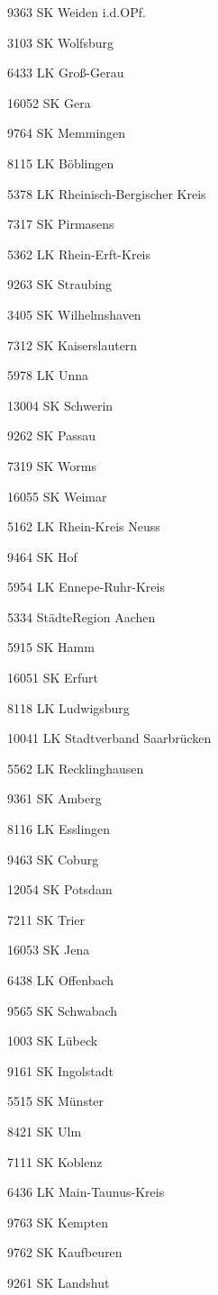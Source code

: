9363  SK Weiden i.d.OPf.

3103  SK Wolfsburg

6433  LK Groß-Gerau

16052  SK Gera

9764  SK Memmingen

8115  LK Böblingen

5378  LK Rheinisch-Bergischer Kreis

7317  SK Pirmasens

5362  LK Rhein-Erft-Kreis

9263  SK Straubing

3405  SK Wilhelmshaven

7312  SK Kaiserslautern

5978  LK Unna

13004  SK Schwerin

9262  SK Passau

7319  SK Worms

16055  SK Weimar

5162  LK Rhein-Kreis Neuss

9464  SK Hof

5954  LK Ennepe-Ruhr-Kreis

5334  StädteRegion Aachen

5915  SK Hamm

16051  SK Erfurt

8118  LK Ludwigsburg

10041  LK Stadtverband Saarbrücken

5562  LK Recklinghausen

9361  SK Amberg

8116  LK Esslingen

9463  SK Coburg

12054  SK Potsdam

7211  SK Trier

16053  SK Jena

6438  LK Offenbach

9565  SK Schwabach

1003  SK Lübeck

9161  SK Ingolstadt

5515  SK Münster

8421  SK Ulm

7111  SK Koblenz

6436  LK Main-Taunus-Kreis

9763  SK Kempten

9762  SK Kaufbeuren

9261  SK Landshut

